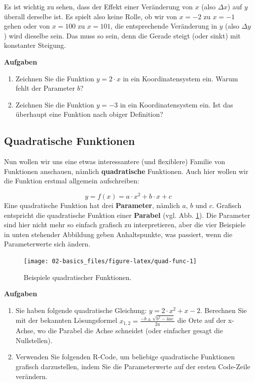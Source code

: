 \documentclass[
]{book}
\providecommand{\tightlist}{%
  \setlength{\itemsep}{0pt}\setlength{\parskip}{0pt}}
\begin{document}
Es ist wichtig zu sehen, dass der Effekt einer Veränderung von \(x\) (also \(\Delta x\)) auf \(y\) überall derselbe ist. Es spielt also keine Rolle, ob wir von \(x=-2\) zu \(x=-1\) gehen oder von \(x=100\) zu \(x=101\), die entsprechende Veränderung in \(y\) (also \(\Delta y\)) wird dieselbe sein. Das muss so sein, denn die Gerade steigt (oder sinkt) mit konstanter Steigung.

\textbf{Aufgaben}

\begin{enumerate}
\def\labelenumi{\arabic{enumi}.}
\tightlist
\item
  Zeichnen Sie die Funktion \(y = 2\cdot x\) in ein Koordinatensystem ein. Warum fehlt der Parameter \(b\)?
\item
  Zeichnen Sie die Funktion \(y=-3\) in ein Koordinatensystem ein. Ist das überhaupt eine Funktion nach obiger Definition?
\end{enumerate}

\hypertarget{quadratische-funktionen}{%
\subsection{Quadratische Funktionen}\label{quadratische-funktionen}}

Nun wollen wir uns eine etwas interessantere (und flexiblere) Familie von Funktionen anschauen, nämlich \textbf{quadratische} Funktionen. Auch hier wollen wir die Funktion erstmal allgemein aufschreiben:

\[
y = f(x) = a \cdot x^2 + b \cdot x + c
\]
Eine quadratische Funktion hat drei \textbf{Parameter}, nämlich \(a\), \(b\) und \(c\). Grafisch entspricht die quadratische Funktion einer \textbf{Parabel} (vgl. Abb. \ref{fig:quad-func}). Die Parameter sind hier nicht mehr so einfach grafisch zu interpretieren, aber die vier Beispiele in unten stehender Abbildung geben Anhaltspunkte, was passiert, wenn die Parameterwerte sich ändern.

\begin{figure}

{\centering \texttt{[image: 02-basics\_files/figure-latex/quad-func-1]} 

}

\caption{Beispiele quadratischer Funktionen.}\label{fig:quad-func}
\end{figure}

\textbf{Aufgaben}

\begin{enumerate}
\def\labelenumi{\arabic{enumi}.}
\tightlist
\item
  Sie haben folgende quadratische Gleichung: \(y = 2 \cdot x^2 + x - 2\). Berechnen Sie mit der bekannten Lösungsformel \(x_{1,2}=\frac{-b \pm \sqrt{b^2 - 4ac}}{2a}\) die Orte auf der x-Achse, wo die Parabel die Achse schneidet (oder einfacher gesagt die Nullstellen).
\item
  Verwenden Sie folgenden R-Code, um beliebige quadratische Funktionen grafisch darzustellen, indem Sie die Parameterwerte auf der ersten Code-Zeile verändern.
\end{enumerate}
\end{document}
